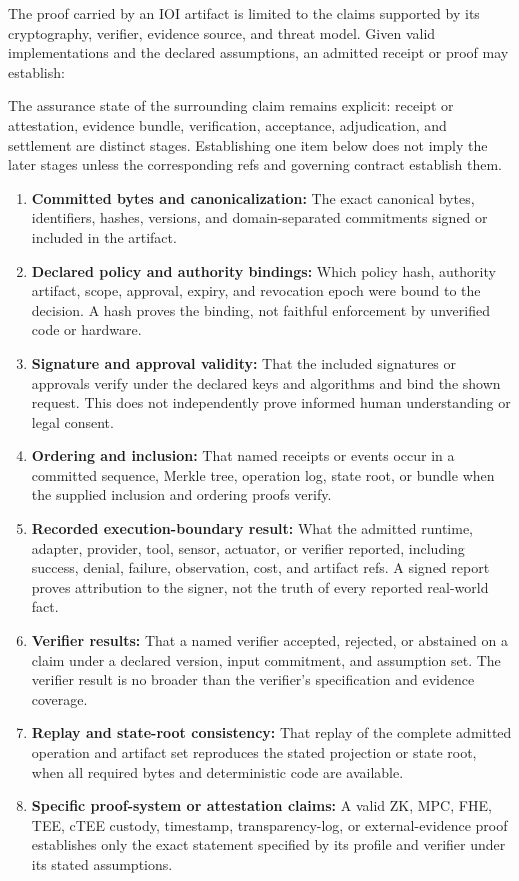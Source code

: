\documentclass[
  11pt,
]{article}
\providecommand{\tightlist}{%
  \setlength{\itemsep}{0pt}\setlength{\parskip}{0pt}}
\begin{document}
The proof carried by an IOI artifact is limited to the claims supported by
its cryptography, verifier, evidence source, and threat model. Given valid
implementations and the declared assumptions, an admitted receipt or proof
may establish:

The assurance state of the surrounding claim remains explicit: receipt or
attestation, evidence bundle, verification, acceptance, adjudication, and
settlement are distinct stages. Establishing one item below does not imply the
later stages unless the corresponding refs and governing contract establish
them.

\begin{enumerate}
\def\labelenumi{\arabic{enumi}.}
\tightlist
\item
  \textbf{Committed bytes and canonicalization:} The exact canonical bytes,
  identifiers, hashes, versions, and domain-separated commitments signed or
  included in the artifact.
\item
  \textbf{Declared policy and authority bindings:} Which policy hash,
  authority artifact, scope, approval, expiry, and revocation epoch were
  bound to the decision. A hash proves the binding, not faithful enforcement
  by unverified code or hardware.
\item
  \textbf{Signature and approval validity:} That the included signatures or
  approvals verify under the declared keys and algorithms and bind the shown
  request. This does not independently prove informed human understanding or
  legal consent.
\item
  \textbf{Ordering and inclusion:} That named receipts or events occur in a
  committed sequence, Merkle tree, operation log, state root, or bundle when
  the supplied inclusion and ordering proofs verify.
\item
  \textbf{Recorded execution-boundary result:} What the admitted runtime,
  adapter, provider, tool, sensor, actuator, or verifier reported, including
  success, denial, failure, observation, cost, and artifact refs. A signed
  report proves attribution to the signer, not the truth of every reported
  real-world fact.
\item
  \textbf{Verifier results:} That a named verifier accepted, rejected, or
  abstained on a claim under a declared version, input commitment, and
  assumption set. The verifier result is no broader than the verifier's
  specification and evidence coverage.
\item
  \textbf{Replay and state-root consistency:} That replay of the complete
  admitted operation and artifact set reproduces the stated projection or
  state root, when all required bytes and deterministic code are available.
\item
  \textbf{Specific proof-system or attestation claims:} A valid ZK, MPC,
  FHE, TEE, cTEE custody, timestamp, transparency-log, or external-evidence
  proof establishes only the exact statement specified by its profile and
  verifier under its stated assumptions.
\end{enumerate}
\end{document}
